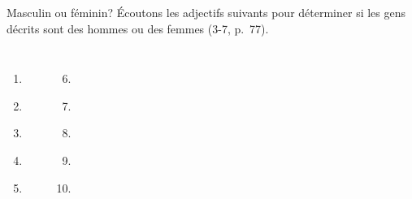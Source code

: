 \begin{frame}{Masculin ou féminin?}
  Écoutons \alert{les adjectifs} suivants pour déterminer si les gens décrits sont \alert{des hommes} ou \alert{des femmes} (3-7, p.~77).
  \begin{columns}
      \begin{enumerate}
        \item \underline{}
        \item \underline{}
        \item \underline{\uncover<4->{femme\ }}
        \item \underline{}
        \item \underline{}
      \end{enumerate}
      \begin{enumerate}
        \setcounter{enumi}{5}
        \item \underline{}
        \item \underline{}
        \item \underline{\uncover<9->{homme}}
        \item \underline{}
        \item \underline{}
      \end{enumerate}
  \end{columns}
\end{frame}